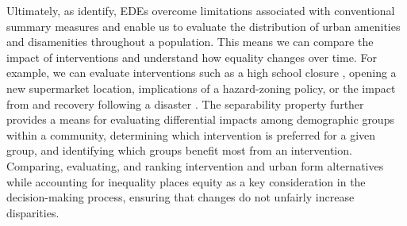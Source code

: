 \documentclass[final,3p,times,onecolumn,sort&compress]{elsarticle}
\begin{document}
Ultimately, as \cite{Sheriff2020-ge} identify, EDEs overcome limitations associated with conventional summary measures and enable us to evaluate the distribution of urban amenities and disamenities throughout a population.
This means we can compare the impact of interventions and understand how equality changes over time. 
For example, we can evaluate interventions such as a high school closure \citep{Pacione1989-ui}, opening a new supermarket location, implications of a hazard-zoning policy, or the impact from and recovery following a disaster \citep{Logan2020-vj}. 
The separability property further provides a means for evaluating differential impacts among demographic groups within a community, determining which intervention is preferred for a given group, and identifying which groups benefit most from an intervention. 
Comparing, evaluating, and ranking intervention and urban form alternatives while accounting for inequality places equity as a key consideration in the decision-making process, ensuring that changes do not unfairly increase disparities. 
\end{document}
